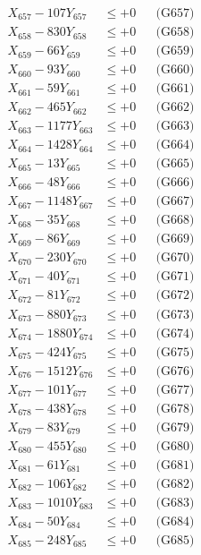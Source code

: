 \documentclass[a4paper,10pt]{article}
\begin{document}
{\begin{align}
X_{657} - 107Y_{657} &\leq +0 && \text{(G657)} \\
X_{658} - 830Y_{658} &\leq +0 && \text{(G658)} \\
X_{659} - 66Y_{659} &\leq +0 && \text{(G659)} \\
X_{660} - 93Y_{660} &\leq +0 && \text{(G660)} \\
\allowbreak
X_{661} - 59Y_{661} &\leq +0 && \text{(G661)} \\
X_{662} - 465Y_{662} &\leq +0 && \text{(G662)} \\
X_{663} - 1177Y_{663} &\leq +0 && \text{(G663)} \\
X_{664} - 1428Y_{664} &\leq +0 && \text{(G664)} \\
X_{665} - 13Y_{665} &\leq +0 && \text{(G665)} \\
X_{666} - 48Y_{666} &\leq +0 && \text{(G666)} \\
X_{667} - 1148Y_{667} &\leq +0 && \text{(G667)} \\
X_{668} - 35Y_{668} &\leq +0 && \text{(G668)} \\
X_{669} - 86Y_{669} &\leq +0 && \text{(G669)} \\
X_{670} - 230Y_{670} &\leq +0 && \text{(G670)} \\
\allowbreak
X_{671} - 40Y_{671} &\leq +0 && \text{(G671)} \\
X_{672} - 81Y_{672} &\leq +0 && \text{(G672)} \\
X_{673} - 880Y_{673} &\leq +0 && \text{(G673)} \\
X_{674} - 1880Y_{674} &\leq +0 && \text{(G674)} \\
X_{675} - 424Y_{675} &\leq +0 && \text{(G675)} \\
X_{676} - 1512Y_{676} &\leq +0 && \text{(G676)} \\
X_{677} - 101Y_{677} &\leq +0 && \text{(G677)} \\
X_{678} - 438Y_{678} &\leq +0 && \text{(G678)} \\
X_{679} - 83Y_{679} &\leq +0 && \text{(G679)} \\
X_{680} - 455Y_{680} &\leq +0 && \text{(G680)} \\
\allowbreak
X_{681} - 61Y_{681} &\leq +0 && \text{(G681)} \\
X_{682} - 106Y_{682} &\leq +0 && \text{(G682)} \\
X_{683} - 1010Y_{683} &\leq +0 && \text{(G683)} \\
X_{684} - 50Y_{684} &\leq +0 && \text{(G684)} \\
X_{685} - 248Y_{685} &\leq +0 && \text{(G685)} \\

\end{align}}
\end{document}
